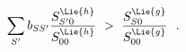 \begin{equation}\label{inequality}
\sum_{S'}b_{SS'}\frac{S^{\Lie{h}}_{S'0}}{S^{\Lie{h}}_{00}}\
> \ \frac{S^{\Lie{g}}_{S0}}{S^{\Lie{g}}_{00}}\ \ .
\end{equation}

